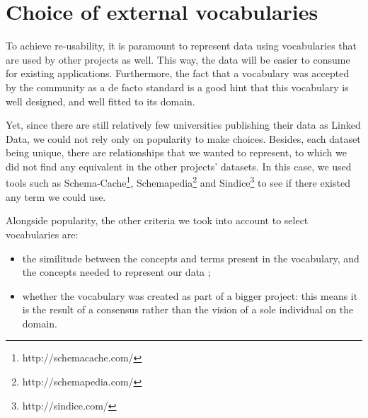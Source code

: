 \documentclass[a4paper,11pt]{report}
\begin{document}
\section{Choice of external vocabularies}
To achieve re-usability, it is paramount to represent data using vocabularies that are used by other projects as well. This way, the data will be easier to consume for existing applications. Furthermore, the fact that a vocabulary was accepted by the community as a de facto standard is a good hint that this vocabulary is well designed, and well fitted to its domain. 

Yet, since there are still relatively few universities publishing their data as Linked Data, we could not rely only on popularity to make choices. Besides, each dataset being unique, there are relationships that we wanted to represent, to which we did not find any equivalent in the other projects' datasets. In this case, we used tools such as Schema-Cache\footnote{http://schemacache.com/}, Schemapedia\footnote{http://schemapedia.com/} and Sindice\footnote{http://sindice.com/} to see if there existed any term we could use. 

Alongside popularity, the other criteria we took into account to select vocabularies are:
\begin{itemize}
\item the similitude between the concepts and terms present in the vocabulary, and the concepts needed to represent our data ;
\item whether the vocabulary was created as part of a bigger project: this means it is the result of a consensus rather than the vision of a sole individual on the domain.
\end{itemize}
\end{document}
